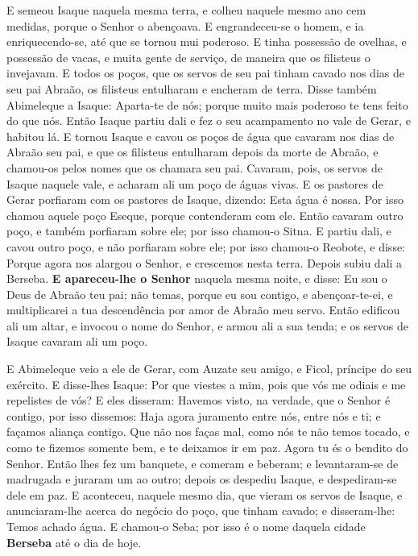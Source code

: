 E semeou Isaque naquela mesma terra, e colheu naquele mesmo ano
cem medidas, porque o Senhor o abençoava. E engrandeceu-se o
homem, e ia enriquecendo-se, até que se tornou mui poderoso.
E tinha possessão de ovelhas, e possessão de vacas, e muita
gente de serviço, de maneira que os filisteus o invejavam. E
todos os poços, que os servos de seu pai tinham cavado nos dias de
seu pai Abraão, os filisteus entulharam e encheram de terra.
Disse também Abimeleque a Isaque: Aparta-te de nós; porque
muito mais poderoso te tens feito do que nós. Então Isaque
partiu dali e fez o seu acampamento no vale de Gerar, e habitou lá.
E tornou Isaque e cavou os poços de água que cavaram nos dias
de Abraão seu pai, e que os filisteus entulharam depois da morte de
Abraão, e chamou-os pelos nomes que os chamara seu pai.
Cavaram, pois, os servos de Isaque naquele vale, e acharam
ali um poço de águas vivas. E os pastores de Gerar porfiaram
com os pastores de Isaque, dizendo: Esta água é nossa. Por isso
chamou aquele poço Eseque, porque contenderam com ele. Então
cavaram outro poço, e também porfiaram sobre ele; por isso chamou-o
Sitna. E partiu dali, e cavou outro poço, e não porfiaram
sobre ele; por isso chamou-o Reobote, e disse: Porque agora nos
alargou o Senhor, e crescemos nesta terra. Depois subiu dali
a Berseba. \textbf{E apareceu-lhe o Senhor} naquela mesma
noite, e disse: Eu sou o Deus de Abraão teu pai; não temas, porque
eu sou contigo, e abençoar-te-ei, e multiplicarei a tua descendência
por amor de Abraão meu servo. Então edificou ali um altar, e
invocou o nome do Senhor, e armou ali a sua tenda; e os servos de
Isaque cavaram ali um poço.

E Abimeleque veio a ele de Gerar, com Auzate seu amigo, e Ficol,
príncipe do seu exército. E disse-lhes Isaque: Por que
viestes a mim, pois que vós me odiais e me repelistes de vós?
E eles disseram: Havemos visto, na verdade, que o Senhor é
contigo, por isso dissemos: Haja agora juramento entre nós, entre
nós e ti; e façamos aliança contigo. Que não nos faças mal,
como nós te não temos tocado, e como te fizemos somente bem, e te
deixamos ir em paz. Agora tu és o bendito do Senhor. Então
lhes fez um banquete, e comeram e beberam; e levantaram-se de
madrugada e juraram um ao outro; depois os despediu Isaque, e
despediram-se dele em paz. E aconteceu, naquele mesmo dia,
que vieram os servos de Isaque, e anunciaram-lhe acerca do negócio
do poço, que tinham cavado; e disseram-lhe: Temos achado água.
E chamou-o Seba; por isso é o nome daquela cidade
\textbf{Berseba} até o dia de hoje.

